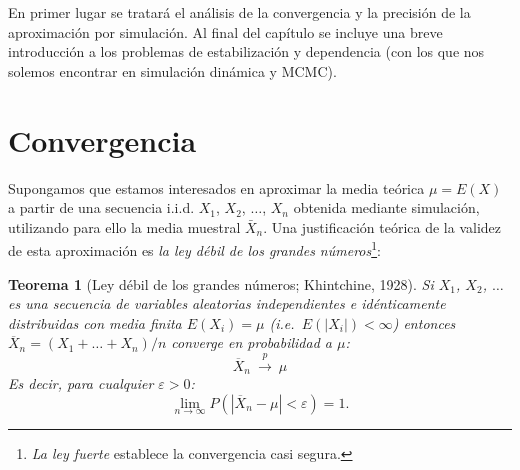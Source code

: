 \documentclass[
  spanish,
  10pt,
]{book}
\theoremstyle{break}
\newtheorem{theorem}{Teorema}[chapter]
\theoremstyle{nonumberplain}
\let\oldfootnote\footnote
\renewcommand\footnote[1]{\oldfootnote{\hspace{2mm}#1}}
\begin{document}
En primer lugar se tratará el análisis de la convergencia y la precisión de la aproximación por simulación.
Al final del capítulo se incluye una breve introducción a los problemas de estabilización y dependencia (con los que nos solemos encontrar en simulación dinámica y MCMC).

\section{Convergencia}\label{convergencia}

Supongamos que estamos interesados en aproximar la media teórica \(\mu = E\left( X\right)\) a partir de una secuencia i.i.d. \(X_{1}\), \(X_{2}\), \(\ldots\), \(X_{n}\) obtenida mediante simulación, utilizando para ello la media muestral \(\bar{X}_{n}\).
Una justificación teórica de la validez de esta aproximación es \emph{la ley débil de los grandes números}\footnote{\emph{La ley fuerte} establece la convergencia casi segura.}:

\begin{theorem}[Ley débil de los grandes números; Khintchine, 1928]
\protect\hypertarget{thm:khinchine}{}\label{thm:khinchine}
Si \(X_{1}\), \(X_{2}\), \(\ldots\) es una secuencia de variables aleatorias independientes e idénticamente distribuidas con media finita \(E\left( X_{i}\right) =\mu\) (i.e.~\(E\left( \left\vert X_{i} \right\vert \right) < \infty\)) entonces \(\overline{X}_{n}=\left( X_{1}+\ldots +X_{n}\right) /n\)
converge en probabilidad a \(\mu\): \[\overline{X}_{n}\ \overset{p}{ \longrightarrow }\ \mu\]
Es decir, para cualquier \(\varepsilon >0\):
\[\lim\limits_{n\rightarrow \infty }P\left( \left\vert \overline{X}_{n}-\mu
\right\vert <\varepsilon \right) = 1.\]
\end{theorem}
\end{document}
